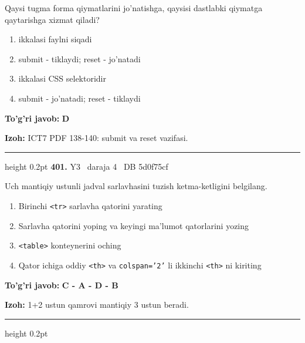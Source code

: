 \documentclass[10pt,a4paper,oneside]{article}
\begin{document}
\par
Qaysi tugma forma qiymatlarini jo'natishga, qaysisi dastlabki qiymatga qaytarishga xizmat qiladi?
\begin{enumerate}[label=\Alph*),leftmargin=9mm]
\item ikkalasi faylni siqadi
\item submit - tiklaydi; reset - jo'natadi
\item ikkalasi CSS selektoridir
\item submit - jo'natadi; reset - tiklaydi
\end{enumerate}
\begin{tcolorbox}[enhanced,breakable,colback=teal!4,colframe=teal!45!black,boxrule=0.45pt,arc=1.2mm,left=2.8mm,right=2.8mm,top=2mm,bottom=2mm,before skip=2mm,after skip=2mm]
\textbf{\color{teal}To'g'ri javob:} \textbf{D}
\par\smallskip
\textbf{Izoh:} ICT7 PDF 138-140: submit va reset vazifasi.
\end{tcolorbox}
\vspace{2mm}\hrule height 0.2pt \vspace{4mm}
\hypertarget{q401}{\textbf{\color{ink}401.}}  {\color{muted}\scriptsize Y3 \textbullet\ daraja 4 \textbullet\ DB 5d0f75cf}
\par
Uch mantiqiy ustunli jadval sarlavhasini tuzish ketma-ketligini belgilang.
\begin{enumerate}[label=\Alph*),leftmargin=9mm]
\item Birinchi \texttt{\textless{}tr\textgreater{}} sarlavha qatorini yarating
\item Sarlavha qatorini yoping va keyingi ma'lumot qatorlarini yozing
\item \texttt{\textless{}table\textgreater{}} konteynerini oching
\item Qator ichiga oddiy \texttt{\textless{}th\textgreater{}} va \texttt{colspan='2'} li ikkinchi \texttt{\textless{}th\textgreater{}} ni kiriting
\end{enumerate}
\begin{tcolorbox}[enhanced,breakable,colback=teal!4,colframe=teal!45!black,boxrule=0.45pt,arc=1.2mm,left=2.8mm,right=2.8mm,top=2mm,bottom=2mm,before skip=2mm,after skip=2mm]
\textbf{\color{teal}To'g'ri javob:} \textbf{C - A - D - B}
\par\smallskip
\textbf{Izoh:} 1+2 ustun qamrovi mantiqiy 3 ustun beradi.
\end{tcolorbox}
\vspace{2mm}\hrule height 0.2pt \vspace{4mm}
\end{document}
